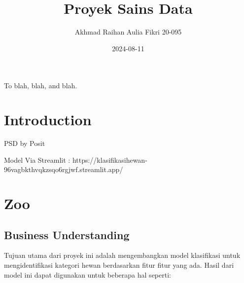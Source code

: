 \documentclass[
  letterpaper,
]{krantz}
\title{Proyek Sains Data}
\author{Akhmad Raihan Aulia Fikri 20-095}
\date{2024-08-11}
\renewcommand*\contentsname{Table of contents}
\newcommand\contentsname{Table of contents}
\begin{document}
\maketitle

\thispagestyle{empty}

\begin{center}
To blah, blah, and blah.
\end{center}

\setlength{\abovedisplayskip}{-5pt}
\setlength{\abovedisplayshortskip}{-5pt}

\ifdefined\Shaded\renewenvironment{Shaded}{\begin{tcolorbox}[breakable, interior hidden, borderline west={3pt}{0pt}{shadecolor}, enhanced, sharp corners, boxrule=0pt, frame hidden]}{\end{tcolorbox}}\fi

\renewcommand*\contentsname{Table of contents}
{
\hypersetup{linkcolor=}
\setcounter{tocdepth}{2}
\tableofcontents
}

\hypertarget{introduction}{%
\chapter*{Introduction}\label{introduction}}


PSD by Posit

Model Via Streamlit :
https://klasifikasihewan-96vagbkthvqkzsqo6rgjwf.streamlit.app/
\mainmatter


\hypertarget{zoo}{%
\chapter{Zoo}\label{zoo}}

\hypertarget{business-understanding}{%
\section{Business Understanding}\label{business-understanding}}

Tujuan utama dari proyek ini adalah mengembangkan model klasifikasi
untuk mengidentifikasi kategori hewan berdasarkan fitur fitur yang ada.
Hasil dari model ini dapat digunakan untuk beberapa hal seperti:
\end{document}
